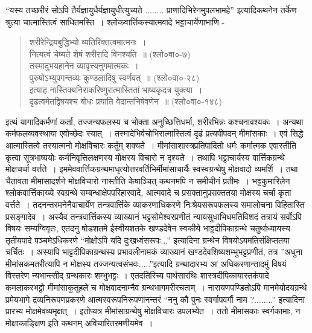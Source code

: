 {“यस्य तच्छरीरं सोऽपि तैर्यज्ञायुधैर्यज्ञायुधीत्युच्यते ........ प्राणादिभिरेनमुपलभामहे” इत्यादिकथनेन तर्केण श्रुत्या चात्मास्तित्वं साधितमस्ति~। श्लोकवार्त्तिकस्यात्मवादे भट्टाचार्येणाभाणि - 
\begin{verse}
शरीरेन्द्रियबुद्धिभ्यो व्यतिरिक्तत्वमात्मनः~। \\
नित्यत्वं चेष्यते शेषं शरीरादि विनश्यति~॥ (श्लो०वा०-७)\\
तस्मादुभयहानेन व्यावृत्त्यनुगमात्मकः~। \\
पुरुषोऽभ्युपगन्तव्यः कुण्डलादिषु स्वर्णवत्~॥ (श्लो०वा०-२८)\\
इत्याह नास्तिक्यनिराकरिष्णुरात्मास्तितां भाष्यकृदत्र युक्त्या~। \\ 
दृढत्वमेतद्विषयश्च बोधः प्रयाति वेदान्तनिषेवणेन~॥ (श्लो०वा०-१४८) 
\end{verse}
इत्थं यागादिकर्मणां कर्ता, तज्जन्यफलस्य च भोक्ता अनुच्छित्तिधर्मा, शरीरभिन्नः कश्चना\-वश्यकः~। अन्यथा कर्मफलव्यवस्थाया एवोच्छेदः स्यात्~। तस्मादेभिर्वचोभिरात्मास्तित्वं दृढं प्रत्यपीपदन् मीमांसकाः~। एवं सिद्धे आत्मास्तित्वे तस्यात्मनो मोक्षविचारः कर्तुम् शक्यते~। मीमांसाशास्त्रप्रतिपादितो धर्मः कर्मात्मक एवास्तीति कृत्वा सूत्रभाष्ययोः कर्मनिवृत्तिलक्षणस्य मोक्षस्य विचारो न दृश्यते~। तथापि भट्टाचार्यस्य वार्त्तिकग्रन्थे मोक्षचर्चा वर्त्तते~। इममेव\-वार्त्तिकग्रन्थमाधृत्योत्तरवर्तिभिर्मीमांसाचार्यैः स्वस्वग्रन्थेषु मोक्षवादो व्यमर्शि~। तथा चैतावता मीमांसादर्शने मोक्षविचारो नास्तीति केेषाञ्चित् कथनमपि न समीचीनं प्रतीमः~। भट्टकुमारिलेन श्लोकवार्त्तिकाख्ये स्वग्रन्थे सम्बन्धाक्षेपपरिहारवादे, आत्मवादे च प्रसक्तानुप्रसक्ततया मोक्षस्य चर्चा कृता वर्त्तते~। 	तदनन्तरमनेनैवाचार्येण तन्त्रवार्त्तिके व्याकरणाधिकरणे निःश्रेयसरूप\-फलस्य समालोचना विहितास्ति प्रसङ्गादेव~। अस्यैव तन्त्रवार्त्तिकस्य व्याख्यानं भट्टसोमेश्वर\-प्रणीतं न्यायसुधाभिधमतिविशदं तत्रायं सर्वोऽपि विषयः सम्यग्विवृतः, एतदनु षोडशतमे \-ईस्वीयशतके खण्डदेवेन स्वकीये भाट्टदीपिकाग्रन्थे चतुर्थाध्यायस्य तृतीयपादे पञ्चमेऽधिकरणे “मोक्षोऽपि यदि दुःखध्वंसरूपः...” इत्यादिना ग्रन्थेन विषयोऽयमतिसंक्षिप्ततया चर्चितः~। अस्यापि भाट्टदीपिकाग्रन्थस्य प्रभावलीनामकं व्याख्यानं खण्डदेवशिष्यशम्भुभट्टप्रणीतं, तत्र ”अधुना मीमांसकमतरीत्यापि न मोक्षस्य तज्जन्यत्वसंभवः.....”इत्यादि ग्रन्थादारभ्य आ अधिकरणान्तादमुं विषयं विस्तरेण न्यभान्त्सीद् ग्रन्थकारः शम्भुभट्टः~। एतदतिरिच्य पार्थसारथिः शास्त्रदीपिकायास्तर्कपादे कमलाकरभट्टो  मीमांसाकुतूहले च मोक्षवादनाम्नैव ग्रन्थभागमरीरचताम्~। नारायणपण्डितोऽपि मानमेयोदयग्रन्थे प्रमेयभागे द्रव्यनिरूपणप्रकरणे आत्मस्वरूपनिरूपणानन्तरं “ननु कौ पुनः स्वर्गापवर्गौ नाम ?........” इत्यादिना प्रारभ्य मोक्षमेवव्यमृक्षत्~। इतोप्यत्र मीमांसाग्रन्थेषु मोक्षविचारः उपलभ्येत~। ततो मीमांसकाः स्वर्गकामाः, न मोक्षाकाङ्क्षिण इति कथनम् अविचारितरमणीयमेव~। 
}
